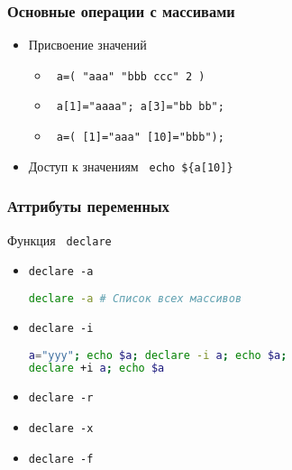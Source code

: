 \begin{frame}[fragile]
\frametitle{Основные операции с массивами}
\begin{itemize}
\item Присвоение значений
 \begin{itemize}
   \item \verb+ a=( "aaa" "bbb ccc" 2 ) +
   \item \verb+ a[1]="aaaa"; a[3]="bb bb";   +
   \item \verb+ a=( [1]="aaa" [10]="bbb"); +
 \end{itemize}
\item Доступ к значениям \verb+ echo ${a[10]} +
\end{itemize}
\end{frame}

\begin{frame}[fragile]
\frametitle{Аттрибуты переменных}
Функция \verb+ declare +
\begin{itemize}
\item {\tt declare -a}
\begin{lstlisting}[language=sh]
declare -a # Список всех массивов
\end{lstlisting} 
\item {\tt declare -i}
\begin{lstlisting}[language=sh]
a="yyy"; echo $a; declare -i a; echo $a;
declare +i a; echo $a
\end{lstlisting}
\item {\tt declare -r}
\item {\tt declare -x}
\item {\tt declare -f}
\end{itemize}
\end{frame}
